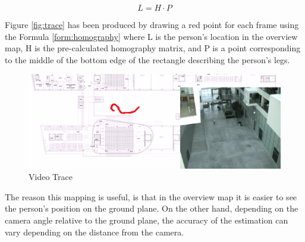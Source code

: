 \begin{equation}
	L = H \cdot P
	\label{form:homography}
\end{equation}

Figure \ref{fig:trace} has been produced by drawing a red point for each frame using the Formula \ref{form:homography} where L is the person's location in the overview map, H is the pre-calculated homography matrix, and P is a point corresponding to the middle of the bottom edge of the rectangle describing the person's legs.

\begin{figure}[h!]
	\centering
	\includegraphics[width=\textwidth]{Handin2/images/personlocationvideo.png}
	\caption{Video Trace}
	\label{fig:video_trace}
\end{figure}

The reason this mapping is useful, is that in the overview map it is easier to see the person's position on the ground plane. On the other hand, depending on the camera angle relative to the ground plane, the accuracy of the estimation can vary depending on the distance from the camera.